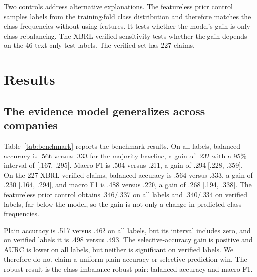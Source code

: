 \documentclass[11pt]{article}
\begin{document}
Two controls address alternative explanations. The featureless prior control samples labels from the training-fold class distribution and therefore matches the class frequencies without using features. It tests whether the model's gain is only class rebalancing. The XBRL-verified sensitivity tests whether the gain depends on the 46 text-only test labels. The verified set has 227 claims.

\section{Results}
\label{sec:results}

\subsection{The evidence model generalizes across companies}
Table~\ref{tab:benchmark} reports the benchmark results. On all labels, balanced accuracy is .566 versus .333 for the majority baseline, a gain of .232 with a 95\% interval of [.167, .295]. Macro F1 is .504 versus .211, a gain of .294 [.228, .359]. On the 227 XBRL-verified claims, balanced accuracy is .564 versus .333, a gain of .230 [.164, .294], and macro F1 is .488 versus .220, a gain of .268 [.194, .338]. The featureless prior control obtains .346/.337 on all labels and .340/.334 on verified labels, far below the model, so the gain is not only a change in predicted-class frequencies.

Plain accuracy is .517 versus .462 on all labels, but its interval includes zero, and on verified labels it is .498 versus .493. The selective-accuracy gain is positive and AURC is lower on all labels, but neither is significant on verified labels. We therefore do not claim a uniform plain-accuracy or selective-prediction win. The robust result is the class-imbalance-robust pair: balanced accuracy and macro F1.
\end{document}
